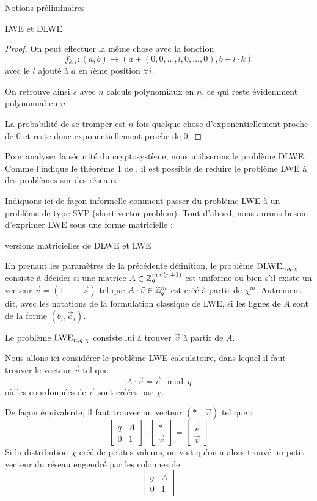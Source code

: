 \begin{section}{Notions préliminaires}
\begin{subsection}{LWE et DLWE}
\begin{proof}
	On peut effectuer la même chose avec la fonction
	\[f_{k,i}: (a,b) \mapsto (a + (0, 0, ..., l, 0, ..., 0), b + l \cdot k) \]
	avec le $l$ ajouté à $a$ en $i$ème position $\forall i$.
	
	On retrouve ainsi $s$ avec $n$ calculs polynomiaux en $n$, ce qui reste évidemment polynomial en $n$.
	
	La probabilité de se tromper est $n$ fois quelque chose d'exponentiellement proche de 0 et reste donc
	exponentiellement proche de 0.
	\end{proof}

	Pour analyser la sécurité du cryptosystème, nous utiliserons le problème DLWE. Comme l'indique le théorème 1 de
	\cite{C:GenSahWat13}, il est possible de réduire le problème LWE à des problèmes sur des réseaux.

	Indiquons ici de façon informelle comment passer du problème LWE à un problème de type SVP (short vector
	problem). Tout d'abord, nous aurons besoin d'exprimer LWE sous une forme matricielle :

	\begin{definition}{versions matricielles de DLWE et LWE}

	En prenant les paramètres de la précédente définition, le problème $\text{DLWE}_{n,q,\chi}$ consiste à décider si une matrice $A \in \mathbb{Z}_q^{m \times (n+1)}$ est uniforme ou bien s'il existe un vecteur $\vec{v} = (1\quad -\vec{s})$ tel que $A \cdot \vec{v} \in \mathbb{Z}_q^{m}$ est créé à partir de $\chi^m$. Autrement dit, avec les notations de la formulation classique de LWE, si les lignes de $A$ sont de la forme $(b_i, \vec{a}_i)$.
	
	Le problème $\text{LWE}_{n,q,\chi}$ consiste lui à trouver $\vec{v}$ à partir de $A$.
	\end{definition}

	Nous allons ici considérer le problème LWE calculatoire, dans lequel il faut trouver le vecteur $\vec{v}$ tel que :
	\[ A\cdot \vec{v} = \vec{e} \mod q \]
	où les coordonnées de $\vec{e}$ sont créées par $\chi$.

	De façon équivalente, il faut trouver un vecteur $(*\quad\vec{v})$ tel que :
	\[ \begin{bmatrix}q & A \\ 0 &1 \end{bmatrix}\cdot
	   \begin{bmatrix}* \\ \vec{v} \end{bmatrix} =
	   \begin{bmatrix} \vec{e} \\ \vec{v} \end{bmatrix} \]
	Si la distribution $\chi$ créé de petites valeurs, on voit qu'on a alors trouvé un \og petit \fg~ vecteur du réseau engendré par les colonnes de 
	\[ \begin{bmatrix}q & A \\ 0 &1 \end{bmatrix} \]


\end{subsection}
\end{section}
